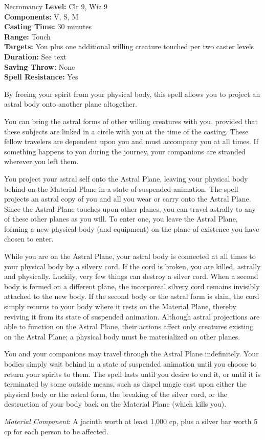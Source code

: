 {Necromancy}
{
	\textbf{Level:}
	Clr 9, Wiz 9\\
	\textbf{Components:}
	V, S, M\\
	\textbf{Casting Time:}
	30 minutes\\
	\textbf{Range:}
	Touch\\
	\textbf{Targets:}
	You plus one additional willing creature touched per two caster levels\\
	\textbf{Duration:}
	See text\\
	\textbf{Saving Throw:}
	None\\
	\textbf{Spell Resistance:}
	Yes\\
}
{
	By freeing your spirit from your physical body, this spell allows you to project an astral body onto another plane altogether.

	You can bring the astral forms of other willing creatures with you, provided that these subjects are linked in a circle with you at the time of the casting. These fellow travelers are dependent upon you and must accompany you at all times. If something happens to you during the journey, your companions are stranded wherever you left them.

	You project your astral self onto the Astral Plane, leaving your physical body behind on the Material Plane in a state of suspended animation. The spell projects an astral copy of you and all you wear or carry onto the Astral Plane. Since the Astral Plane touches upon other planes, you can travel astrally to any of these other planes as you will. To enter one, you leave the Astral Plane, forming a new physical body (and equipment) on the plane of existence you have chosen to enter.

	While you are on the Astral Plane, your astral body is connected at all times to your physical body by a silvery cord. If the cord is broken, you are killed, astrally and physically. Luckily, very few things can destroy a silver cord. When a second body is formed on a different plane, the incorporeal silvery cord remains invisibly attached to the new body. If the second body or the astral form is slain, the cord simply returns to your body where it rests on the Material Plane, thereby reviving it from its state of suspended animation. Although astral projections are able to function on the Astral Plane, their actions affect only creatures existing on the Astral Plane; a physical body must be materialized on other planes.

	You and your companions may travel through the Astral Plane indefinitely. Your bodies simply wait behind in a state of suspended animation until you choose to return your spirits to them. The spell lasts until you desire to end it, or until it is terminated by some outside means, such as dispel magic cast upon either the physical body or the astral form, the breaking of the silver cord, or the destruction of your body back on the Material Plane (which kills you).

	\textit{Material Component}:
	A jacinth worth at least 1,000 cp, plus a silver bar worth 5 cp for each person to be affected.

}

